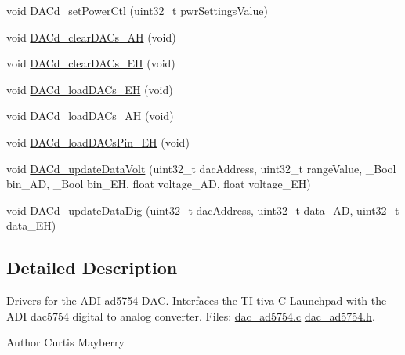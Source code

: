 \begin{DoxyCompactItemize}
\item 
void \hyperlink{group___d_a_c__ad5754_ga094f43f6aa44b22562d49efe5403c2ca}{D\+A\+Cd\+\_\+set\+Power\+Ctl} (uint32\+\_\+t pwr\+Settings\+Value)
\item 
void \hyperlink{group___d_a_c__ad5754_ga45f4b52890f9373b7781925529b37f5a}{D\+A\+Cd\+\_\+clear\+D\+A\+Cs\+\_\+\+A\+H} (void)
\item 
void \hyperlink{group___d_a_c__ad5754_gafdc88b1e8452f3717199e9dfbc780992}{D\+A\+Cd\+\_\+clear\+D\+A\+Cs\+\_\+\+E\+H} (void)
\item 
void \hyperlink{group___d_a_c__ad5754_ga5aa63b602b15c7328deb2e562501e8d2}{D\+A\+Cd\+\_\+load\+D\+A\+Cs\+\_\+\+E\+H} (void)
\item 
void \hyperlink{group___d_a_c__ad5754_gaa88d6be5a9ccd5ff94b102c1f1a4b464}{D\+A\+Cd\+\_\+load\+D\+A\+Cs\+\_\+\+A\+H} (void)
\item 
void \hyperlink{group___d_a_c__ad5754_ga2b2a5da94a4c27b60e1577793bdb970e}{D\+A\+Cd\+\_\+load\+D\+A\+Cs\+Pin\+\_\+\+E\+H} (void)
\item 
void \hyperlink{group___d_a_c__ad5754_gaa6e1b8d821a10a4ca887a743f2123b3d}{D\+A\+Cd\+\_\+update\+Data\+Volt} (uint32\+\_\+t dac\+Address, uint32\+\_\+t range\+Value, \+\_\+\+Bool bin\+\_\+\+A\+D, \+\_\+\+Bool bin\+\_\+\+E\+H, float voltage\+\_\+\+A\+D, float voltage\+\_\+\+E\+H)
\item 
void \hyperlink{group___d_a_c__ad5754_ga14aa5f3fc7902cd96eefd32b56b728d4}{D\+A\+Cd\+\_\+update\+Data\+Dig} (uint32\+\_\+t dac\+Address, uint32\+\_\+t data\+\_\+\+A\+D, uint32\+\_\+t data\+\_\+\+E\+H)
\end{DoxyCompactItemize}


\subsection{Detailed Description}
Drivers for the A\+D\+I ad5754 D\+A\+C. Interfaces the T\+I tiva C Launchpad with the A\+D\+I dac5754 digital to analog converter. Files\+: \hyperlink{dac__ad5754_8c_source}{dac\+\_\+ad5754.\+c} \hyperlink{dac__ad5754_8h_source}{dac\+\_\+ad5754.\+h}. 

\begin{DoxyAuthor}{Author}
Curtis Mayberry 
\end{DoxyAuthor}


